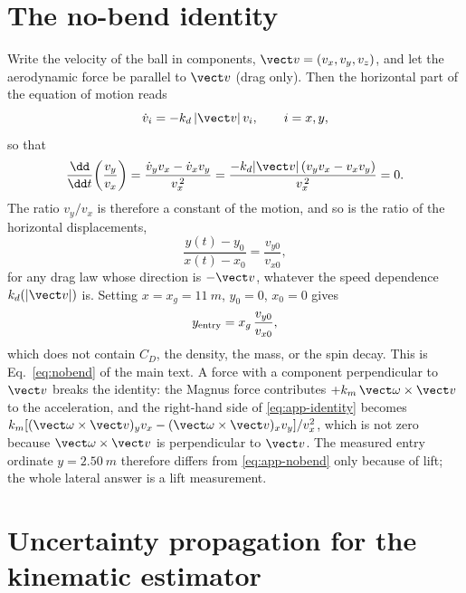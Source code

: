 \appendix

\section{The no-bend identity}
\label{app:nobend}

Write the velocity of the ball in components, $\vect v=(v_x,v_y,v_z)$, and
let the aerodynamic force be parallel to $\vect v$ (drag only). Then the
horizontal part of the equation of motion reads
\begin{equation}
  \dot v_i = -k_d\,|\vect v|\,v_i, \qquad i=x,y ,
  \label{eq:app-drag}
\end{equation}
so that
\begin{equation}
  \frac{\dd}{\dd t}\!\left(\frac{v_y}{v_x}\right)
  = \frac{\dot v_y v_x - \dot v_x v_y}{v_x^{\,2}}
  = \frac{-k_d|\vect v|\,(v_y v_x - v_x v_y)}{v_x^{\,2}} = 0 .
  \label{eq:app-identity}
\end{equation}
The ratio $v_y/v_x$ is therefore a constant of the motion, and so is the
ratio of the horizontal displacements,
\begin{equation}
  \frac{y(t)-y_0}{x(t)-x_0} = \frac{v_{y0}}{v_{x0}} ,
  \label{eq:app-ratio}
\end{equation}
for any drag law whose direction is $-\vect v$, whatever the speed
dependence $k_d(|\vect v|)$ is. Setting $x=x_g=\SI{11}{m}$,
$y_0=0$, $x_0=0$ gives
\begin{equation}
  y_{\rm entry} = x_g\,\frac{v_{y0}}{v_{x0}} ,
  \label{eq:app-nobend}
\end{equation}
which does not contain $C_D$, the density, the mass, or the spin decay. This
is Eq.~\eqref{eq:nobend} of the main text. A force with a component
perpendicular to $\vect v$ breaks the identity: the Magnus force contributes
$+k_m\,\vect\omega\times\vect v$ to the acceleration, and the right-hand side
of \eqref{eq:app-identity} becomes
$k_m[(\vect\omega\times\vect v)_y v_x-(\vect\omega\times\vect v)_x v_y]/v_x^{2}$,
which is not zero because $\vect\omega\times\vect v$ is perpendicular to
$\vect v$. The measured
entry ordinate $y=\SI{2.50}{m}$ therefore differs from
\eqref{eq:app-nobend} only because of lift; the whole lateral answer is a
lift measurement.

\section{Uncertainty propagation for the kinematic estimator}
\label{app:jacobian}

